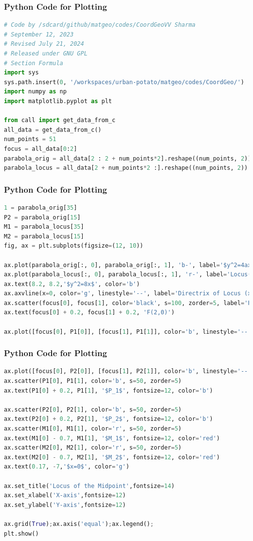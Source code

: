 \documentclass{beamer}
\theoremstyle{remark}
\numberwithin{equation}{section}
\begin{document}
\begin{frame}[fragile]
\frametitle{Python Code for Plotting}
\begin{lstlisting}[language=Python]
# Code by /sdcard/github/matgeo/codes/CoordGeoVV Sharma
# September 12, 2023
# Revised July 21, 2024
# Released under GNU GPL
# Section Formula
import sys
sys.path.insert(0, '/workspaces/urban-potato/matgeo/codes/CoordGeo/') 
import numpy as np
import matplotlib.pyplot as plt

from call import get_data_from_c
all_data = get_data_from_c()
num_points = 51
focus = all_data[0:2]
parabola_orig = all_data[2 : 2 + num_points*2].reshape((num_points, 2))
parabola_locus = all_data[2 + num_points*2 :].reshape((num_points, 2))

\end{lstlisting}
\end{frame}
\begin{frame}[fragile]
\frametitle{Python Code for Plotting}
\begin{lstlisting}[language=Python]
1 = parabola_orig[35]
P2 = parabola_orig[15]
M1 = parabola_locus[35]
M2 = parabola_locus[15]
fig, ax = plt.subplots(figsize=(12, 10))

ax.plot(parabola_orig[:, 0], parabola_orig[:, 1], 'b-', label='$y^2=4ax(a=2)$')
ax.plot(parabola_locus[:, 0], parabola_locus[:, 1], 'r-', label='Locus(Midpoint) Parabola')
ax.text(8.2, 8.2,'$y^2=8x$', color='b')
ax.axvline(x=0, color='g', linestyle='--', label='Directrix of Locus (x=0)')
ax.scatter(focus[0], focus[1], color='black', s=100, zorder=5, label='Focus (F)')
ax.text(focus[0] + 0.2, focus[1] + 0.2, 'F(2,0)')

ax.plot([focus[0], P1[0]], [focus[1], P1[1]], color='b', linestyle='--')
\end{lstlisting}
\end{frame}
\begin{frame}[fragile]
\frametitle{Python Code for Plotting}
\begin{lstlisting}[language=Python]
ax.plot([focus[0], P2[0]], [focus[1], P2[1]], color='b', linestyle='--')
ax.scatter(P1[0], P1[1], color='b', s=50, zorder=5)
ax.text(P1[0] + 0.2, P1[1], '$P_1$', fontsize=12, color='b')

ax.scatter(P2[0], P2[1], color='b', s=50, zorder=5)
ax.text(P2[0] + 0.2, P2[1], '$P_2$', fontsize=12, color='b')
ax.scatter(M1[0], M1[1], color='r', s=50, zorder=5)
ax.text(M1[0] - 0.7, M1[1], '$M_1$', fontsize=12, color='red')
ax.scatter(M2[0], M2[1], color='r', s=50, zorder=5)
ax.text(M2[0] - 0.7, M2[1], '$M_2$', fontsize=12, color='red')
ax.text(0.17, -7,'$x=0$', color='g')

ax.set_title('Locus of the Midpoint',fontsize=14)
ax.set_xlabel('X-axis',fontsize=12)
ax.set_ylabel('Y-axis',fontsize=12)

ax.grid(True);ax.axis('equal');ax.legend();
plt.show()

\end{lstlisting}
\end{frame}
\end{document}
